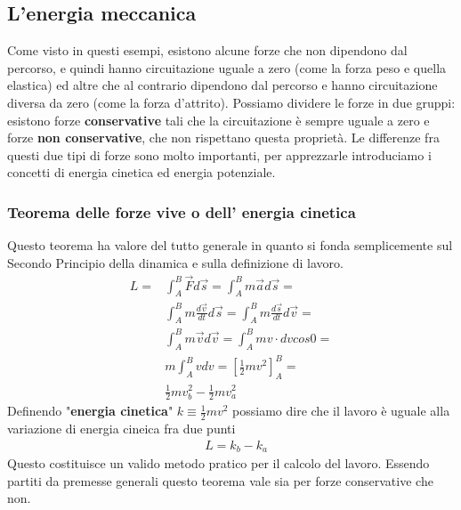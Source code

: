 \subsection{L'energia meccanica}
Come visto in questi esempi, esistono alcune forze che non dipendono dal percorso, e quindi hanno circuitazione uguale a zero (come la forza peso e quella elastica) ed altre che al contrario dipendono dal percorso e hanno circuitazione diversa da zero (come la forza d'attrito). Possiamo dividere le forze in due gruppi: esistono forze \textbf{conservative} tali che la circuitazione è sempre uguale a zero e forze \textbf{non conservative}, che non rispettano questa proprietà. Le differenze fra questi due tipi di forze sono molto importanti, per apprezzarle introduciamo i concetti di energia cinetica ed energia potenziale.
\subsubsection{Teorema delle forze vive o dell' energia cinetica}
Questo teorema ha valore del tutto generale in quanto si fonda semplicemente sul Secondo Principio della dinamica e sulla definizione di lavoro.
\begin{align*}
	L =& \int_{A}^{B}\vec{F} d\vec{s}= \int_{A}^{B}m\vec{a} d\vec{s}=\\
	&\int_{A}^{B}m\frac{d\vec{v}}{dt} d\vec{s}=\int_{A}^{B}m\frac{d\vec{s}}{dt} d\vec{v}=\\
	&\int_{A}^{B}m\vec{v} d\vec{v}=\int_{A}^{B}m v\cdot dv cos0=\\
	&m\int_{A}^{B} v dv=[\frac{1}{2}mv^2]_{A}^{B}=\\
	&\frac{1}{2}mv_b^2-\frac{1}{2}mv_a^2
\end{align*}
Definendo "\textbf{energia cinetica}" $k \equiv \frac{1}{2}mv^2$ possiamo dire che il lavoro è uguale alla variazione di energia cineica fra due punti
\begin{align*}
	&L = k_b -k_a
\end{align*}
Questo costituisce un valido metodo pratico per il calcolo del lavoro. Essendo partiti da premesse generali questo teorema vale sia per forze conservative che non.

